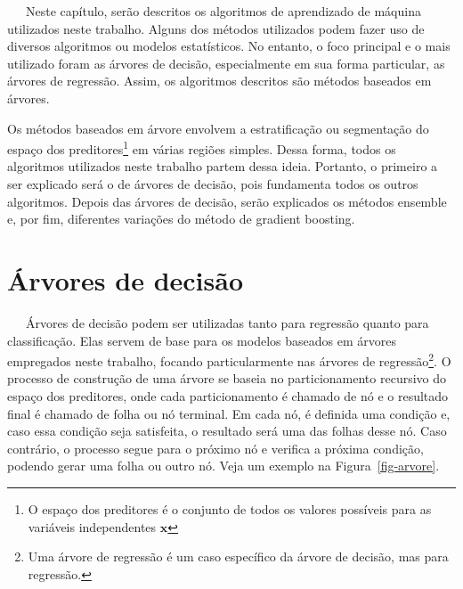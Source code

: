 \documentclass[
  12pt,
  a4paper,
]{scrreprt}
\begin{document}
~~~Neste capítulo, serão descritos os algoritmos de aprendizado de
máquina utilizados neste trabalho. Alguns dos métodos utilizados podem
fazer uso de diversos algoritmos ou modelos estatísticos. No entanto, o
foco principal e o mais utilizado foram as árvores de decisão,
especialmente em sua forma particular, as árvores de regressão. Assim,
os algoritmos descritos são métodos baseados em árvores.

\vspace{12pt}

Os métodos baseados em árvore envolvem a estratificação ou segmentação
do espaço dos preditores\footnote{O espaço dos preditores é o conjunto
  de todos os valores possíveis para as variáveis independentes
  \(\mathbf{x}\)} em várias regiões simples. Dessa forma, todos os
algoritmos utilizados neste trabalho partem dessa ideia. Portanto, o
primeiro a ser explicado será o de árvores de decisão, pois fundamenta
todos os outros algoritmos. Depois das árvores de decisão, serão
explicados os métodos ensemble e, por fim, diferentes variações do
método de gradient boosting.

\section{Árvores de decisão}\label{uxe1rvores-de-decisuxe3o}

~~~Árvores de decisão podem ser utilizadas tanto para regressão quanto
para classificação. Elas servem de base para os modelos baseados em
árvores empregados neste trabalho, focando particularmente nas árvores
de regressão\footnote{Uma árvore de regressão é um caso específico da
  árvore de decisão, mas para regressão.}. O processo de construção de
uma árvore se baseia no particionamento recursivo do espaço dos
preditores, onde cada particionamento é chamado de nó e o resultado
final é chamado de folha ou nó terminal. Em cada nó, é definida uma
condição e, caso essa condição seja satisfeita, o resultado será uma das
folhas desse nó. Caso contrário, o processo segue para o próximo nó e
verifica a próxima condição, podendo gerar uma folha ou outro nó. Veja
um exemplo na Figura~\ref{fig-arvore}.
\end{document}
